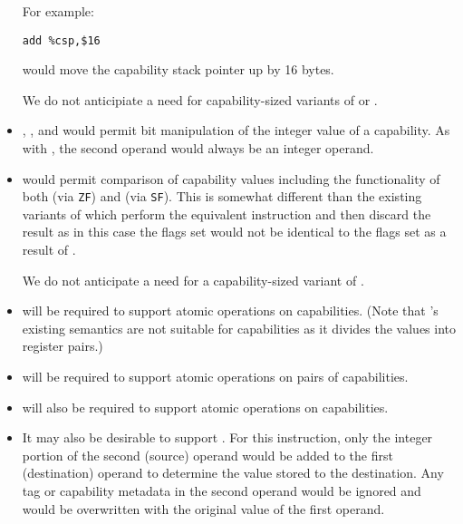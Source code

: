 \begin{itemize}
    For example:

\begin{verbatim}
add %csp,$16
\end{verbatim}

    would move the capability stack pointer up by 16 bytes.

    We do not anticipiate a need for capability-sized variants of
     or .

  \item {}, , and  would
    permit bit manipulation of the integer value of a capability.  As
    with , the second operand would always be an
    integer operand.

  \item {} would permit comparison of capability values
    including the functionality of both  (via
    \texttt{ZF}) and  (via \texttt{SF}).  This is
    somewhat different than the existing variants of 
    which perform the equivalent  instruction and then
    discard the result as in this case the flags set would not be
    identical to the flags set as a result of .

    We do not anticipate a need for a capability-sized variant of
    .

  \item {} will be required to support atomic
    operations on capabilities.  (Note that 's
    existing semantics are not suitable for capabilities as it divides
    the values into register pairs.)

  \item {} will be required to support atomic
    operations on pairs of capabilities.

  \item {} will also be required to support atomic
    operations on capabilities.

  \item It may also be desirable to support .  For
    this instruction, only the integer portion of the second (source)
    operand would be added to the first
    (destination) operand to determine the value stored to the
    destination.  Any tag or capability metadata in the second operand
    would be ignored and would be overwritten with the original value
    of the first operand.


\end{itemize}
